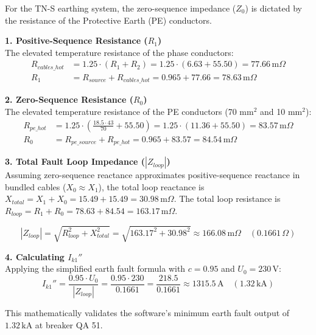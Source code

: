 \documentclass[11pt, a4paper]{article}
\begin{document}
For the TN-S earthing system, the zero-sequence impedance ($Z_0$) is dictated by the resistance of the Protective Earth (PE) conductors.

\noindent \textbf{1. Positive-Sequence Resistance ($R_1$)} \\
The elevated temperature resistance of the phase conductors:
\begin{align}
    R_{cables\_hot} &= 1.25 \cdot (R_1 + R_2) = 1.25 \cdot (6.63 + 55.50) = 77.66 \, \text{m}\Omega \\
    R_1 &= R_{source} + R_{cables\_hot} = 0.965 + 77.66 = 78.63 \, \text{m}\Omega
\end{align}

\noindent \textbf{2. Zero-Sequence Resistance ($R_0$)} \\
The elevated temperature resistance of the PE conductors (70 mm$^2$ and 10 mm$^2$):
\begin{align}
    R_{pe\_hot} &= 1.25 \cdot \left( \frac{18.5 \cdot 43}{70} + 55.50 \right) = 1.25 \cdot (11.36 + 55.50) = 83.57 \, \text{m}\Omega \\
    R_0 &= R_{pe\_source} + R_{pe\_hot} = 0.965 + 83.57 = 84.54 \, \text{m}\Omega
\end{align}

\noindent \textbf{3. Total Fault Loop Impedance ($|Z_{loop}|$)} \\
Assuming zero-sequence reactance approximates positive-sequence reactance in bundled cables ($X_0 \approx X_1$), the total loop reactance is $X_{total} = X_1 + X_0 = 15.49 + 15.49 = 30.98 \, \text{m}\Omega$. The total loop resistance is $R_{loop} = R_1 + R_0 = 78.63 + 84.54 = 163.17 \, \text{m}\Omega$.

\begin{equation}
    |Z_{loop}| = \sqrt{R_{loop}^2 + X_{total}^2} = \sqrt{163.17^2 + 30.98^2} \approx 166.08 \, \text{m}\Omega \quad (0.1661 \, \Omega)
\end{equation}

\noindent \textbf{4. Calculating $I_{k1}''$} \\
Applying the simplified earth fault formula with $c = 0.95$ and $U_0 = 230 \, \text{V}$:
\begin{equation}
    I_{k1}'' = \frac{0.95 \cdot U_0}{|Z_{loop}|} = \frac{0.95 \cdot 230}{0.1661} = \frac{218.5}{0.1661} \approx 1315.5 \, \text{A} \quad (1.32 \, \text{kA})
\end{equation}

This mathematically validates the software's minimum earth fault output of $1.32 \, \text{kA}$ at breaker QA 51.
\end{document}
